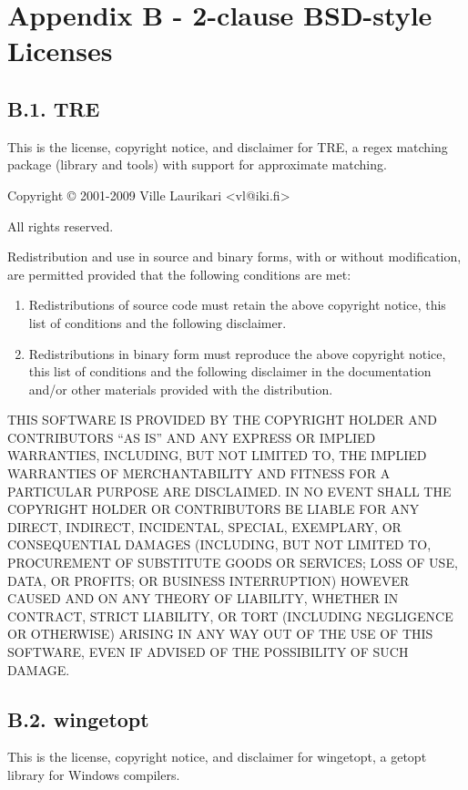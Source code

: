 \chapter*{Appendix B - 2-clause BSD-style Licenses}

\section*{B.1. TRE}
This is the license, copyright notice, and disclaimer for TRE, a regex
matching package (library and tools) with support for approximate
matching.

\bigskip
\noindent Copyright © 2001-2009 Ville Laurikari <vl@iki.fi>

\noindent All rights reserved.

\bigskip
\noindent Redistribution and use in source and binary forms, with or without
modification, are permitted provided that the following conditions
are met:

\begin{enumerate}
  \item 
  Redistributions of source code must retain the above copyright
     notice, this list of conditions and the following disclaimer.

\item 
  Redistributions in binary form must reproduce the above copyright
     notice, this list of conditions and the following disclaimer in the
     documentation and/or other materials provided with the distribution.
\end{enumerate}

\noindent THIS SOFTWARE IS PROVIDED BY THE COPYRIGHT HOLDER AND CONTRIBUTORS
``AS IS'' AND ANY EXPRESS OR IMPLIED WARRANTIES, INCLUDING, BUT NOT
LIMITED TO, THE IMPLIED WARRANTIES OF MERCHANTABILITY AND FITNESS FOR
A PARTICULAR PURPOSE ARE DISCLAIMED.  IN NO EVENT SHALL THE COPYRIGHT
HOLDER OR CONTRIBUTORS BE LIABLE FOR ANY DIRECT, INDIRECT, INCIDENTAL,
SPECIAL, EXEMPLARY, OR CONSEQUENTIAL DAMAGES (INCLUDING, BUT NOT
LIMITED TO, PROCUREMENT OF SUBSTITUTE GOODS OR SERVICES; LOSS OF USE,
DATA, OR PROFITS; OR BUSINESS INTERRUPTION) HOWEVER CAUSED AND ON ANY
THEORY OF LIABILITY, WHETHER IN CONTRACT, STRICT LIABILITY, OR TORT
(INCLUDING NEGLIGENCE OR OTHERWISE) ARISING IN ANY WAY OUT OF THE USE
OF THIS SOFTWARE, EVEN IF ADVISED OF THE POSSIBILITY OF SUCH DAMAGE.


\section*{B.2. wingetopt}
This is the license, copyright notice, and disclaimer for wingetopt,
a getopt library for Windows compilers.


